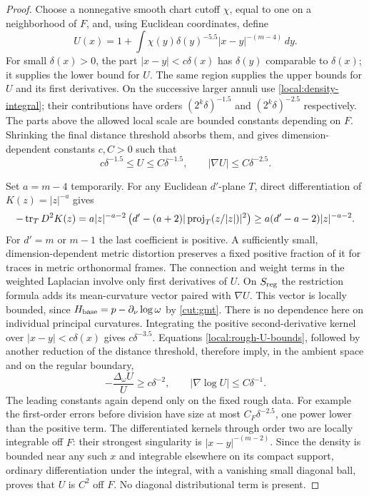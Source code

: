 \begin{proof}
Choose a nonnegative smooth chart cutoff $\chi$, equal to one on a
neighborhood of $F$, and, using Euclidean coordinates, define
\begin{equation}\label{local:rough-potential}
 U(x)=1+\int\chi(y)\delta(y)^{-5.5}|x-y|^{-(m-4)}\,dy.
\end{equation}
For small $\delta(x)>0$, the part $|x-y|<c\delta(x)$ has
$\delta(y)$ comparable to $\delta(x)$; it supplies the lower bound
for $U$.  The same region supplies the upper bounds for $U$ and its
first derivatives.  On the successive larger annuli use
\eqref{local:density-integral}; their contributions have orders
$(2^k\delta)^{-1.5}$ and $(2^k\delta)^{-2.5}$ respectively.
The parts above the allowed local scale are bounded constants
depending on $F$.  Shrinking the final distance threshold absorbs
them, and gives dimension-dependent constants $c,C>0$ such that
\begin{equation}\label{local:rough-U-bounds}
 c\delta^{-1.5}\le U\le C\delta^{-1.5},
 \qquad |\nabla U|\le C\delta^{-2.5}.
\end{equation}

Set $a=m-4$ temporarily.  For any Euclidean $d'$-plane $T$, direct
differentiation of $K(z)=|z|^{-a}$ gives
\[
 -\operatorname{tr}_T D^2K(z)
 =a|z|^{-a-2}\left(d'-(a+2)|\operatorname{proj}_T(z/|z|)|^2\right)
 \ge a(d'-a-2)|z|^{-a-2}.
\]
For $d'=m$ or $m-1$ the last coefficient is positive.  A sufficiently
small, dimension-dependent metric distortion preserves a fixed
positive fraction of it for traces in metric orthonormal frames.
The connection and weight terms in the weighted Laplacian involve
only first derivatives of $U$.  On $S_{\rm reg}$ the restriction
formula adds its mean-curvature vector paired with $\nabla U$.
This vector is locally bounded, since
$H_{\rm base}=p-\partial_\nu\log\omega$ by \cref{cut:gmt}.
There is no dependence here on individual principal curvatures.
Integrating the positive second-derivative kernel over
$|x-y|<c\delta(x)$ gives $c\delta^{-3.5}$.  Equations
\eqref{local:rough-U-bounds}, followed by another reduction of the
distance threshold, therefore imply, in the ambient space and on
the regular boundary,
\begin{equation}\label{local:U-superharmonic}
 -\frac{\Delta_\omega U}{U}\ge c\delta^{-2},
 \qquad |\nabla\log U|\le C\delta^{-1}.
\end{equation}
The leading constants again depend only on the fixed rough data.
For example the first-order errors before division have size at
most $C_F\delta^{-2.5}$, one power lower than the positive term.
The differentiated kernels through order two are locally integrable
off $F$: their strongest singularity is $|x-y|^{-(m-2)}$.
Since the density is bounded near any such $x$ and integrable
elsewhere on its compact support, ordinary differentiation under
the integral, with a vanishing small diagonal ball, proves that
$U$ is $C^2$ off $F$.  No diagonal distributional term is present.


\end{proof}
